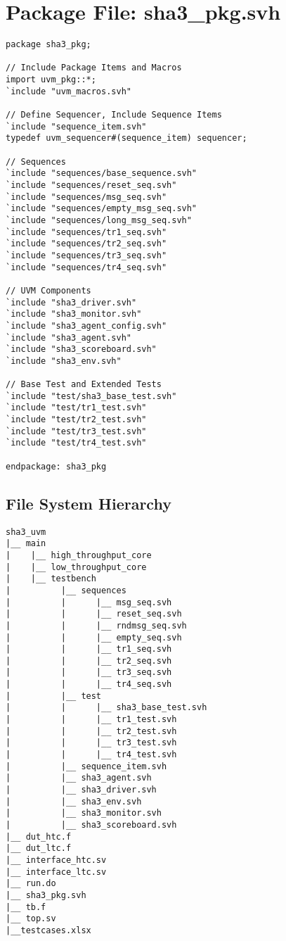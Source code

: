 \chapter{Package File: sha3\_pkg.svh}

\begin{verbatim}
package sha3_pkg;

// Include Package Items and Macros
import uvm_pkg::*;
`include "uvm_macros.svh"

// Define Sequencer, Include Sequence Items   
`include "sequence_item.svh"
typedef uvm_sequencer#(sequence_item) sequencer;

// Sequences
`include "sequences/base_sequence.svh"
`include "sequences/reset_seq.svh"
`include "sequences/msg_seq.svh"
`include "sequences/empty_msg_seq.svh"
`include "sequences/long_msg_seq.svh"
`include "sequences/tr1_seq.svh"
`include "sequences/tr2_seq.svh"
`include "sequences/tr3_seq.svh"
`include "sequences/tr4_seq.svh"

// UVM Components
`include "sha3_driver.svh"
`include "sha3_monitor.svh"
`include "sha3_agent_config.svh"
`include "sha3_agent.svh"
`include "sha3_scoreboard.svh"
`include "sha3_env.svh"

// Base Test and Extended Tests 
`include "test/sha3_base_test.svh"
`include "test/tr1_test.svh"
`include "test/tr2_test.svh"
`include "test/tr3_test.svh"
`include "test/tr4_test.svh"

endpackage: sha3_pkg

\end{verbatim}

\newpage
\section{File System Hierarchy}
\begin{verbatim}
sha3_uvm
|__ main
|    |__ high_throughput_core
|    |__ low_throughput_core
|    |__ testbench
|          |__ sequences
|          |      |__ msg_seq.svh
|          |      |__ reset_seq.svh
|          |      |__ rndmsg_seq.svh
|          |      |__ empty_seq.svh
|          |      |__ tr1_seq.svh
|          |      |__ tr2_seq.svh
|          |      |__ tr3_seq.svh
|          |      |__ tr4_seq.svh
|          |__ test
|          |      |__ sha3_base_test.svh
|          |      |__ tr1_test.svh
|          |      |__ tr2_test.svh
|          |      |__ tr3_test.svh
|          |      |__ tr4_test.svh
|          |__ sequence_item.svh
|          |__ sha3_agent.svh
|          |__ sha3_driver.svh
|          |__ sha3_env.svh
|          |__ sha3_monitor.svh
|          |__ sha3_scoreboard.svh
|__ dut_htc.f
|__ dut_ltc.f
|__ interface_htc.sv
|__ interface_ltc.sv
|__ run.do
|__ sha3_pkg.svh
|__ tb.f
|__ top.sv
|__testcases.xlsx
\end{verbatim}